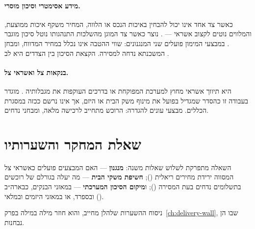 \paragraph{מידע אסימטרי וסיכון מוסרי.}\label{subsec:ch1-asymmetric}\label{subsec:ch1-moral-hazard}
כאשר צד אחד אינו יכול להבחין באיכות הנכס או הלווה, המחיר משקף איכות ממוצעת, והמלווים נוטים לקצוב אשראי —  \cite{akerlof1970,stiglitz1981}.  נוצר כאשר צד המוגן מהשלכות התנהגותו נוטל סיכון מוגבר \cite{holmstrom1979}. במבצעי המימון פועלים שני המנגנונים: שווי ההטבה אינו נכלל במחיר המדווח, ומבחן המשכנתא נדחה למסירה. הקצאת הסיכון בין הצדדים היא לב .

\paragraph{בנקאות צל ואשראי צל.}\label{subsec:ch1-shadow}
 היא תיווך אשראי מחוץ למערכת המפוקחת או בדרכים העוקפות את מגבלותיה \cite{pozsar2010,gorton2012}.  מוגדר בעבודה זו כהסדר שמגדיל בפועל את מינוף משק הבית או היזם, אך אינו נרשם ככזה במסגרת הכללים. מבצעי  עונים להגדרה: הרוכש מתחייב לרכישה מלאה, ומבחני  נדחים.


\section{שאלת המחקר והשערותיו}
\label{sec:ch1-rq}

\begin{researchquestion}
\ResearchQuestion
\end{researchquestion}

\noindent השאלה מתפרקת לשלוש שאלות משנה: \textbf{מנגנון} — האם המבצעים פועלים כאשראי צל המסווה ירידת מחירים ריאלית (); \textbf{חשיפת משקי הבית} — מה יעלה בגורלם של רוכשים בתשלומים נדחים בעת המסירה (); ו\textbf{מיקום הסיכון המערכתי} — במאזני הבנקים, כבארה״ב ובספרד, או במאזני היזמים ובמלאי ().

\label{sec:ch1-hypotheses}ניסוח ההשערות שלהלן מחייב, והוא חוזר מילה במילה בפרק~\ref{ch:delivery-wall}, שבו הן נבחנות.

